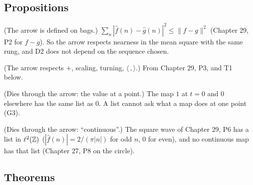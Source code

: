 \subsection*{Propositions}

\begin{lines}
\item[\lab{P1}] (The arrow is defined on bags.) $\sum_n |\widehat f(n) - \widehat g(n)|^2 \le \|f - g\|^2$ (Chapter 29, P2 for $f - g$). So the arrow respects nearness in the mean square with the same rung, and D2 does not depend on the sequence chosen.
\item[\lab{P2}] (The arrow respects $+$, scaling, turning, $\langle\,,\rangle$.) From Chapter 29, P3, and T1 below.
\item[\lab{P3}] (Dies through the arrow: the value at a point.) The map $1$ at $t = 0$ and $0$ elsewhere has the same list as $0$. A list cannot ask what a map does at one point (G3).
\item[\lab{P4}] (Dies through the arrow: ``continuous''.) The square wave of Chapter 29, P6 has a list in $\ell^2(\mathbb{Z})$ ($|\widehat f(n)| = 2/(\pi |n|)$ for odd $n$, $0$ for even), and no continuous map has that list (Chapter 27, P8 on the circle).
\end{lines}

\subsection*{Theorems}


